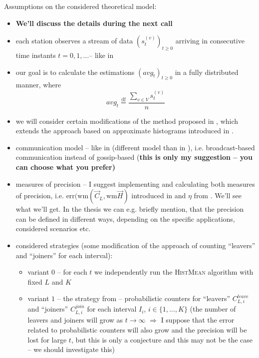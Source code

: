 \documentclass[a4paper, 12pt]{article}
\begin{document}
Assumptions on the considered theoretical model: 
\begin{itemize}
	\item \textbf{We'll discuss the details during the next call}
	\item each station observes a stream of data $(s^{(v)}_t)_{t \geq 0}$ arriving in consecutive time instants $t = 0, 1, \dotsc$-- like in \cite{Nugroho:2020:AveragingTS}
	\item our goal is to calculate the estimations $(avg_t)_{t\geq 0}$ in a fully distributed manner, where
		\[
			avg_t \stackrel{\text{df}}{=} \frac {\sum_{v \in V} s^{(v)}_t}{n}
		\]
	\item we will consider certain modifications of the method proposed in \cite{Nugroho:2020:AveragingTS}, which extends the approach based on approximate histograms
		introduced in \cite{JCi:2018:Histograms}.
	\item communication model -- like in \cite{JCi:2018:Histograms} (different model than in \cite{Nugroho:2020:AveragingTS}), i.e. broadcast-based communication instead of gossip-based
		(\textbf{this is only my suggestion -- you can choose what you prefer)}
	\item measures of precision -- I suggest implementing and calculating both measures of precision, i.e. $\text{err}(\text{wm}(\vec{C}_L,\text{wm}\vec{H})$ introduced in \cite{JCi:2018:Histograms}
		and $\eta$ from \cite{Nugroho:2020:AveragingTS}. We'll see what we'll get. In the thesis we can e.g. briefly mention, that the precision can be defined in different ways, 
		depending on the specific applications, considered scenarios etc.
	\item considered strategies (some modification of the approach of counting ``leavers'' and ``joiners'' for each interval):
		\begin{itemize}
			\item variant $0$ -- for each $t$ we independently run the \textsc{HistMean} algorithm with fixed $L$ and $K$
			\item variant $1$ -- the strategy from \cite{Nugroho:2020:AveragingTS} -- probabilistic counters for ``leavers'' $C^{leave}_{L,i}$ and ``joiners'' $C^{join}_{L,i}$
				for each interval $I_i$, $i \in \{1, \dotsc, K\}$  (the number of leavers and joiners will grow as
				$t \to \infty$ $\Rightarrow$ I suppose that the error related to probabilistic counters will also grow and the precision will be lost for large $t$,
				but this is only a conjecture and this may not be the case -- we should investigate this)\\

\end{itemize}
\end{itemize}
\end{document}
